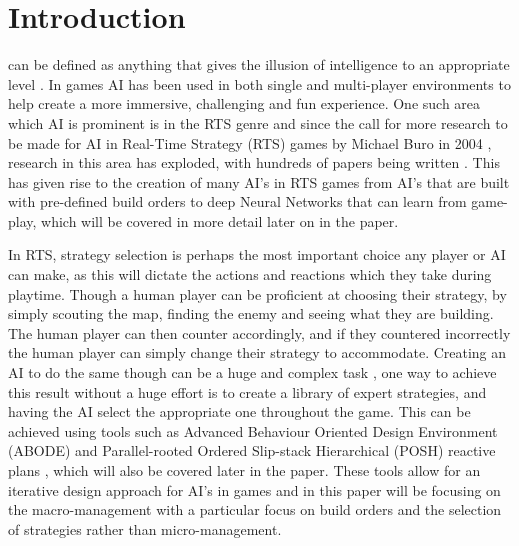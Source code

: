 \documentclass[journal]{IEEEtran}
\begin{document}
\section{Introduction}
 can be defined as anything that gives the illusion of intelligence to an appropriate level \cite{AIBook}. In games AI has been used in both single and multi-player environments to help create a more immersive, challenging and fun experience. One such area which AI is prominent is in the RTS genre and since the call for more research to be made for AI in Real-Time Strategy (RTS) games by Michael Buro in 2004 \cite{CallFor}, research in this area has exploded, with hundreds of papers being written \cite{Survey}. This has given rise to the creation of many AI's in RTS games from AI's that are built with pre-defined build orders \cite{Swen} to deep Neural Networks \cite{Deep} that can learn from game-play, which will be covered in more detail later on in the paper.

In RTS, strategy selection is perhaps the most important choice any player or AI can make, as this will dictate the actions and reactions which they take during playtime. Though a human player can be proficient at choosing their strategy, by simply scouting the map, finding the enemy and seeing what they are building. The human player can then counter accordingly, and if they countered incorrectly the human player can simply change their strategy to accommodate. Creating an AI to do the same though can be a huge and complex task \cite{Fuzzy}\cite{OnlineEvo}\cite{GoalDriven}, one way to achieve this result without a huge effort is to create a library of expert strategies, and having the AI select the appropriate one throughout the game. This can be achieved using tools such as Advanced Behaviour Oriented Design Environment (ABODE) and Parallel-rooted Ordered Slip-stack Hierarchical (POSH) reactive plans \cite{POSH}, which will also be covered later in the paper. These tools allow for an iterative design approach for AI's in games and in this paper will be focusing on the macro-management with a particular focus on build orders and the selection of strategies rather than micro-management.
\end{document}
